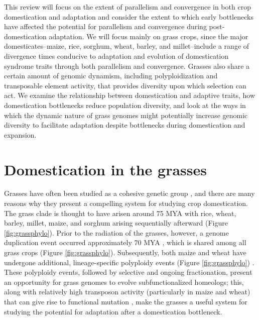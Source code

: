 \documentclass[12pt]{article}
\begin{document}
This review will focus on the extent of parallelism and convergence in both crop domestication and adaptation and consider the extent to which early bottlenecks have affected the potential for parallelism and convergence during post-domestication adaptation.
We will focus mainly on grass crops, since the major domesticates--maize, rice, sorghum, wheat, barley, and millet--include a range of divergence times conducive to adaptation and evolution of domestication syndrome traits through both parallelism and convergence.
Grasses also share a certain amount of genomic dynamism, including polyploidization and transposable element activity, that provides diversity upon which selection can act.
We examine the relationship between domestication and adaptive traits, how domestication bottlenecks reduce population diversity, and look at the ways in which the dynamic nature of grass genomes might potentially increase genomic diversity to facilitate adaptation despite bottlenecks during domestication and expansion.
\paragraph{}

\section*{Domestication in the grasses}
Grasses have often been studied as a cohesive genetic group \citep{pmid8379002, pmid11244100}, and there are many reasons why they present a compelling system for studying crop domestication.
The grass clade is thought to have arisen around 75 MYA \citep{BOUCHENAKKHELLADI2010, Kellogg2001} with rice, wheat, barley, millet, maize, and sorghum arising sequentially afterward (Figure \ref{fig:grassphylo}).
Prior to the radiation of the grasses, however, a genome duplication event occurred approximately 70 MYA \citep{Paterson2004}, which is shared among all grass crops (Figure \ref{fig:grassphylo}).
Subsequently, both maize and wheat have undergone additional, lineage-specific polyploidy events (Figure \ref{fig:grassphylo}) \citep{Levy2002}.
These polyploidy events, followed by selective and ongoing fractionation, present an opportunity for grass genomes to evolve subfunctionalized homeologs; this, along with relatively high transposon activity (particularly in maize and wheat) that can give rise to functional mutation \citep{Wicker2016, Lisch2001}, make the grasses a useful system for studying the potential for adaptation after a domestication bottleneck.
\end{document}
